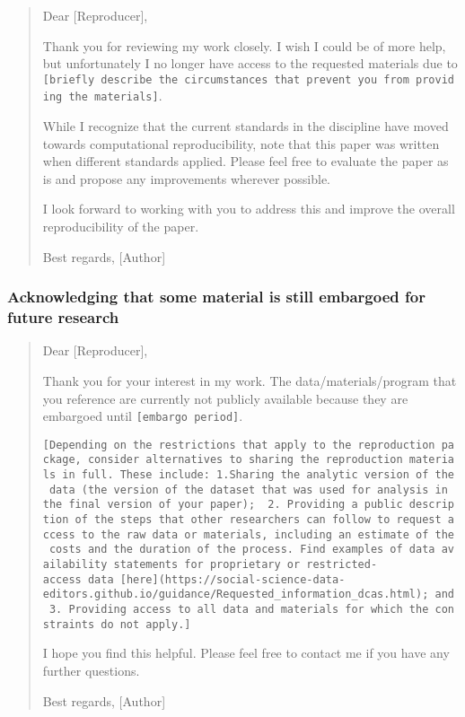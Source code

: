 \begin{quote}
Dear {[}Reproducer{]},

Thank you for reviewing my work closely. I wish I could be of more help,
but unfortunately I no longer have access to the requested materials due
to
\texttt{{[}briefly\ describe\ the\ circumstances\ that\ prevent\ you\ from\ providing\ the\ materials{]}}.

While I recognize that the current standards in the discipline have
moved towards computational reproducibility, note that this paper was
written when different standards applied. Please feel free to evaluate
the paper as is and propose any improvements wherever possible.

I look forward to working with you to address this and improve the
overall reproducibility of the paper.

Best regards, {[}Author{]}
\end{quote}

\subsubsection{Acknowledging that some material is still embargoed for future research}

\begin{quote}
Dear {[}Reproducer{]},

Thank you for your interest in my work. The data/materials/program that
you reference are currently not publicly available because they are
embargoed until \texttt{{[}embargo\ period{]}}.

\texttt{{[}Depending\ on\ the\ restrictions\ that\ apply\ to\ the\ reproduction\ package,\ consider\ alternatives\ to\ sharing\ the\ reproduction\ materials\ in\ full.\ These\ include:\ 1.Sharing\ the\ analytic\ version\ of\ the\ data\ (the\ version\ of\ the\ dataset\ that\ was\ used\ for\ analysis\ in\ the\ final\ version\ of\ your\ paper);\ \ 2.\ Providing\ a\ public\ description\ of\ the\ steps\ that\ other\ researchers\ can\ follow\ to\ request\ access\ to\ the\ raw\ data\ or\ materials,\ including\ an\ estimate\ of\ the\ costs\ and\ the\ duration\ of\ the\ process.\ Find\ examples\ of\ data\ availability\ statements\ for\ proprietary\ or\ restricted-access\ data\ {[}here{]}(https://social-science-data-editors.github.io/guidance/Requested\_information\_dcas.html);\ and\ 3.\ Providing\ access\ to\ all\ data\ and\ materials\ for\ which\ the\ constraints\ do\ not\ apply.{]}}

I hope you find this helpful. Please feel free to contact me if you have
any further questions.

Best regards, {[}Author{]}
\end{quote}

